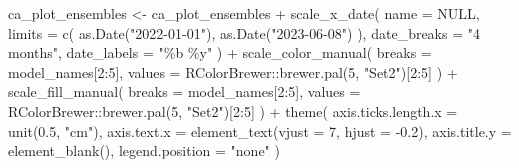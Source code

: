 \documentclass[
]{article}
\newenvironment{Shaded}{\begin{snugshade}}{\end{snugshade}}
\newcommand{\AttributeTok}[1]{\textcolor[rgb]{0.40,0.45,0.13}{#1}}
\newcommand{\ConstantTok}[1]{\textcolor[rgb]{0.56,0.35,0.01}{#1}}
\newcommand{\DecValTok}[1]{\textcolor[rgb]{0.68,0.00,0.00}{#1}}
\newcommand{\FloatTok}[1]{\textcolor[rgb]{0.68,0.00,0.00}{#1}}
\newcommand{\FunctionTok}[1]{\textcolor[rgb]{0.28,0.35,0.67}{#1}}
\newcommand{\NormalTok}[1]{\textcolor[rgb]{0.00,0.23,0.31}{#1}}
\newcommand{\OtherTok}[1]{\textcolor[rgb]{0.00,0.23,0.31}{#1}}
\newcommand{\SpecialCharTok}[1]{\textcolor[rgb]{0.37,0.37,0.37}{#1}}
\newcommand{\StringTok}[1]{\textcolor[rgb]{0.13,0.47,0.30}{#1}}
\begin{document}
\begin{Shaded}
\begin{Highlighting}[]
\NormalTok{ca\_plot\_ensembles }\OtherTok{\textless{}{-}}\NormalTok{ ca\_plot\_ensembles }\SpecialCharTok{+}
  \FunctionTok{scale\_x\_date}\NormalTok{(}
    \AttributeTok{name =} \ConstantTok{NULL}\NormalTok{, }\AttributeTok{limits =} \FunctionTok{c}\NormalTok{(}
      \FunctionTok{as.Date}\NormalTok{(}\StringTok{"2022{-}01{-}01"}\NormalTok{),}
      \FunctionTok{as.Date}\NormalTok{(}\StringTok{"2023{-}06{-}08"}\NormalTok{)}
\NormalTok{    ),}
    \AttributeTok{date\_breaks =} \StringTok{"4 months"}\NormalTok{, }\AttributeTok{date\_labels =} \StringTok{"\%b \textquotesingle{}\%y"}
\NormalTok{  ) }\SpecialCharTok{+}
  \FunctionTok{scale\_color\_manual}\NormalTok{(}
    \AttributeTok{breaks =}\NormalTok{ model\_names[}\DecValTok{2}\SpecialCharTok{:}\DecValTok{5}\NormalTok{],}
    \AttributeTok{values =}\NormalTok{ RColorBrewer}\SpecialCharTok{::}\FunctionTok{brewer.pal}\NormalTok{(}\DecValTok{5}\NormalTok{, }\StringTok{"Set2"}\NormalTok{)[}\DecValTok{2}\SpecialCharTok{:}\DecValTok{5}\NormalTok{]}
\NormalTok{  ) }\SpecialCharTok{+}
  \FunctionTok{scale\_fill\_manual}\NormalTok{(}
    \AttributeTok{breaks =}\NormalTok{ model\_names[}\DecValTok{2}\SpecialCharTok{:}\DecValTok{5}\NormalTok{],}
    \AttributeTok{values =}\NormalTok{ RColorBrewer}\SpecialCharTok{::}\FunctionTok{brewer.pal}\NormalTok{(}\DecValTok{5}\NormalTok{, }\StringTok{"Set2"}\NormalTok{)[}\DecValTok{2}\SpecialCharTok{:}\DecValTok{5}\NormalTok{]}
\NormalTok{  ) }\SpecialCharTok{+}
  \FunctionTok{theme}\NormalTok{(}
    \AttributeTok{axis.ticks.length.x =} \FunctionTok{unit}\NormalTok{(}\FloatTok{0.5}\NormalTok{, }\StringTok{"cm"}\NormalTok{),}
    \AttributeTok{axis.text.x =} \FunctionTok{element\_text}\NormalTok{(}\AttributeTok{vjust =} \DecValTok{7}\NormalTok{, }\AttributeTok{hjust =} \SpecialCharTok{{-}}\FloatTok{0.2}\NormalTok{),}
    \AttributeTok{axis.title.y =} \FunctionTok{element\_blank}\NormalTok{(),}
    \AttributeTok{legend.position =} \StringTok{"none"}
\NormalTok{  )}


\end{Highlighting}
\end{Shaded}
\end{document}
